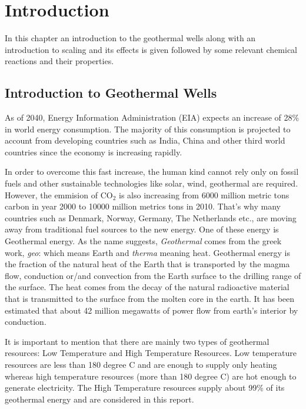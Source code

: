 
\chapter{Introduction}
In this chapter an introduction to the geothermal wells along with an introduction to scaling and its effects is given followed by some relevant chemical reactions and their properties. 

\section{Introduction to Geothermal Wells}
\newline \newline
As of 2040, Energy Information Administration (EIA) expects an increase of 28\% in world energy consumption. The majority of this consumption is projected to account from developing countries such as India, China and other third world countries since the economy is increasing rapidly. \cite{EIA}

In order to overcome this fast increase, the human kind cannot rely only on fossil fuels and other sustainable technologies like solar, wind, geothermal are required. However, the emmision of CO$_2$ is also increasing from 6000 million metric tons carbon in year 2000 to 10000 million metrics tons in 2010. That's why many countries such as Denmark, Norway, Germany, The Netherlands etc., are moving away from traditional fuel sources to the new energy. One of these energy is Geothermal energy. 
\newline\newline
As the name suggests, \textit{Geothermal} comes from the greek work, \textit{geo}: which means Earth and \textit{therma} meaning heat. 
Geothermal energy is the fraction of the natural heat of the Earth that is transported by the magma flow, conduction or/and convection from the Earth surface to the drilling range of the surface. The heat comes from the decay of the natural radioactive material that is transmitted to the surface from the molten core in the earth. It has been estimated that about 42 million megawatts of power flow from earth’s interior by conduction.\cite{Stef}
\newline\newline

It is important to mention that there are mainly two types of geothermal resources: Low Temperature and High Temperature Resources. Low temperature resources are less than 180 degree C and are enough to supply only heating whereas high temperature resources (more than 180 degree C) are hot enough to generate electricity. The High Temperature resources supply about 99\% of its geothermal energy and are considered in this report. \cite{Sae2013}

